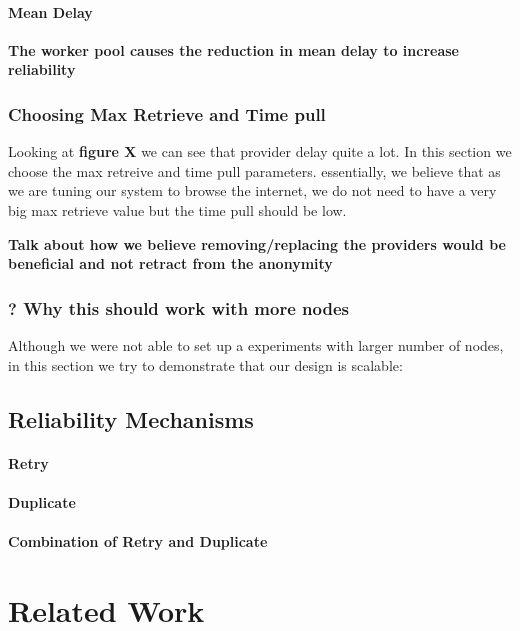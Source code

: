 \documentclass[a4paper,11pt,oneside]{report}
\begin{document}
\subsubsection{Mean Delay}
\textbf{The worker pool causes the reduction in mean delay to increase reliability }

\subsection{Choosing Max Retrieve and Time pull}

Looking at \textbf{figure X} we can see that provider delay quite a lot.
In this section we choose the max retreive and time pull parameters. essentially, we believe that as we are tuning our system to browse the internet, we do not need to have a very big max retrieve value but the time pull should be low.

\textbf{Talk about how we believe removing/replacing the providers would be beneficial and not retract from the anonymity}

\subsection{? Why this should work with more nodes}
Although we were not able to set up a experiments with larger number of nodes, in this section we try to demonstrate that our design is scalable:

\section{Reliability Mechanisms}
\subsubsection{Retry}

\subsubsection{Duplicate}

\subsubsection{Combination of Retry and Duplicate}


\chapter{Related Work}
\end{document}
